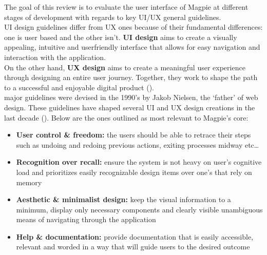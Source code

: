 The goal of this review is to evaluate the user interface of Magpie at different stages of development with regards to key UI/UX general guidelines.\\
UI design guidelines differ from UX ones because of their fundamental differences: one is user based and the other isn't. \textbf{UI design} aims to create a visually appealing, intuitive and user\-friendly interface that allows for easy navigation and interaction with the application.\\
On the other hand, \textbf{UX design} aims to create a meaningful user experience through designing an entire user journey. Together, they work to shape the path to a successful and enjoyable digital product (\cite{uiuxguidelines2023}).\\

 major guidelines were devised in the 1990's by Jakob Nielsen, the `father' of web design. These guidelines have shaped several UI and UX design creations in the last decade (\cite{uiuxguidelinesnielsen2016}). Below are the ones outlined as most relevant to Magpie's core:
\begin{itemize}
    \item \textbf{User control \& freedom:} the users should be able to retrace their steps such as undoing and redoing previous actions, exiting processes midway etc\ldots\\
    \item \textbf{Recognition over recall:} ensure the system is not heavy on user's cognitive load and prioritizes easily recognizable design items over one's that rely on memory\\
    \item \textbf{Aesthetic \& minimalist design:} keep the visual information to a minimum, display only necessary components and clearly visible unambiguous means of navigating through the application\\
    \item \textbf{Help \& documentation:} provide documentation that is easily accessible, relevant and worded in a way that will guide users to the desired outcome
\end{itemize}

